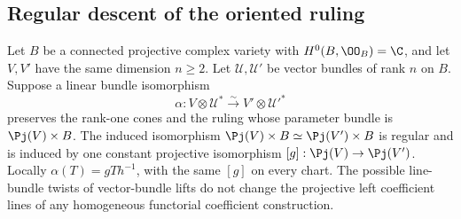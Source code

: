 \subsection{Regular descent of the oriented ruling}

\begin{lemma}
\label{lem:oriented-segre-descent}
Let \(B\) be a connected projective complex variety with
\(H^0(B,\OO_B)=\C\), and let \(V,V'\) have the same dimension
\(n\ge2\).  Let \(\mathcal U,\mathcal U'\) be vector bundles
of rank \(n\) on \(B\).  Suppose a linear bundle isomorphism
\[
 \alpha:V\otimes\mathcal U^*\xrightarrow{\sim}
                         V'\otimes\mathcal U'^*
\]
preserves the rank-one cones and the ruling whose parameter bundle
is \(\Pj(V)\times B\).  The induced isomorphism
\(\Pj(V)\times B\simeq\Pj(V')\times B\) is regular and is
induced by one constant projective isomorphism \([g]:\Pj(V)\to\Pj(V')\).
Locally \(\alpha(T)=gTh^{-1}\), with the same \([g]\) on every
chart.  The possible line-bundle twists of vector-bundle lifts do
not change the projective left coefficient lines of any homogeneous
functorial coefficient construction.
\end{lemma}
